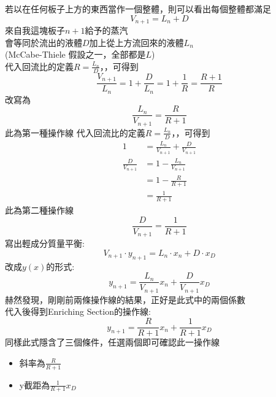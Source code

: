 \documentclass[../main.tex]{subfiles}
\begin{document}
\begin{itemize}
\begin{itemize}
    若以在任何板子上方的東西當作一個整體，則可以看出每個整體都滿足
    \begin{equation}
      V_{n+1} = L_n + D
    \end{equation}
    來自我這塊板子$n+1$給予的蒸汽\\
    會等同於流出的液體$D$加上從上方流回來的液體$L_n$\\
    (McCabe-Thiele 假設之一，全部都是$L$)\\
    代入回流比的定義$R=\frac{L_n}{D}$，，可得到
    \begin{equation}
      \frac{V_{n+1}}{L_n} = 1 + \frac{D}{L_n} = 1 + \frac{1}{R} = \frac{R+1}{R}
    \end{equation}
    改寫為
    \begin{equation}
      \boxed{\frac{L_n}{V_{n+1}} = \frac{R}{R+1}}
    \end{equation}
    此為第一種操作線
    代入回流比的定義$R=\frac{L_n}{D}$，，可得到
    \begin{align}
      1 &= \frac{L_n}{V_{n+1}} + \frac{D}{V_{n+1}}\nonumber\\
      \frac{D}{V_{n+1}} &= 1 - \frac{L_n}{V_{n+1}} \nonumber\\
      &= 1- \frac{R}{R+1} \nonumber\\
      &= \frac{1}{R+1}
    \end{align}
    此為第二種操作線
    \begin{equation}
      \boxed{\frac{D}{V_{n+1}} = \frac{1}{R+1}}
    \end{equation}
    寫出輕成分質量平衡:
    \begin{equation}
      V_{n+1} \cdot y_{n+1} = L_n \cdot x_n + D \cdot x_D
    \end{equation}
    改成$y(x)$的形式:
    \begin{equation}
      y_{n+1} = \boxed{\frac{L_n}{V_{n+1}}} x_n + \boxed{\frac{D}{V_{n+1}}} x_D
    \end{equation}
    赫然發現，剛剛前兩條操作線的結果，正好是此式中的兩個係數\\
    代入後得到Enriching Section的操作線:
    \begin{equation}
      \boxed{y_{n+1} = \frac{R}{R+1}x_n + \frac{1}{R+1}x_D} \label{eq:enriching_section_operation_line}
    \end{equation}
    同樣此式隱含了三個條件，任選兩個即可確認此一操作線
    \begin{itemize}
      \item 斜率為$\frac{R}{R+1}$
      \item y截距為$\frac{1}{R+1}x_D$

\end{itemize}
\end{itemize}
\end{itemize}
\end{document}
